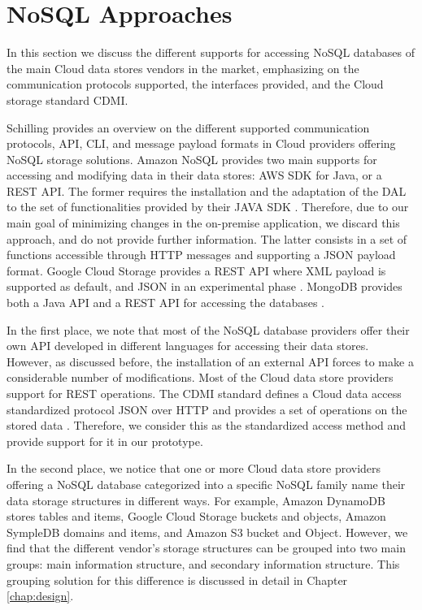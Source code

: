 \section{NoSQL Approaches}
\label{sec:relatedworksnosql}


In this section we discuss the different supports for accessing \ac{NoSQL} databases of the main Cloud data stores vendors in the market, emphasizing on the communication protocols supported, the interfaces provided, and the Cloud storage standard CDMI.

Schilling provides an overview on the different supported communication protocols, \ac{API}, \ac{CLI}, and message payload formats in Cloud providers offering \ac{NoSQL} storage solutions. Amazon \ac{NoSQL} provides two main supports for accessing and modifying data in their data stores: AWS SDK for Java, or a REST \ac{API}. The former requires the installation and the adaptation of the DAL to the set of functionalities provided by their JAVA SDK \cite{amazondynamodb}. Therefore, due to our main goal of minimizing changes in the on-premise application, we discard this approach, and do not provide further information. The latter consists in a set of functions accessible through \ac{HTTP} messages and supporting a \ac{JSON} payload format. Google Cloud Storage provides a REST \ac{API} where \ac{XML} payload is supported as default, and \ac{JSON} in an experimental phase \cite{googlecloudstorage}. MongoDB provides both a Java API and a REST API for accessing the databases \cite{mongodb}.

In the first place, we note that most of the \ac{NoSQL} database providers offer their own API developed in different languages for accessing their data stores. However, as discussed before, the installation of an external API forces to make a considerable number of modifications. Most of the Cloud data store providers support for REST operations. The CDMI standard defines a Cloud data access standardized protocol \ac{JSON} over \ac{HTTP} and provides a set of operations on the stored data \cite{cdmispec2012}. Therefore, we consider this as the standardized access method and provide support for it in our prototype. 

In the second place, we notice that one or more Cloud data store providers offering a \ac{NoSQL} database categorized into a specific \ac{NoSQL} family name their data storage structures in different ways. For example, Amazon DynamoDB stores tables and items, Google Cloud Storage buckets and objects, Amazon SympleDB domains and items, and Amazon S3 bucket and Object. However, we find that the different vendor's storage structures can be grouped into two main groups: main information structure, and secondary information structure. This grouping solution for this difference is discussed in detail in Chapter \ref{chap:design}.

\clearpage  